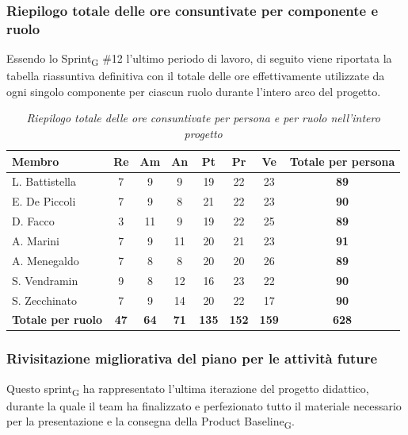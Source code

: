 ﻿\documentclass[a4paper, 10pt, colorlinks=true, linkcolor=black, urlcolor=blue, citecolor=blue, hidelinks]{article}
\renewcommand{\arraystretch}{1.2}
\begin{document}
\subsubsection{Riepilogo totale delle ore consuntivate per componente e ruolo}
Essendo lo Sprint\textsubscript{G} \#12 l'ultimo periodo di lavoro, di seguito viene riportata la tabella riassuntiva definitiva con il totale delle ore effettivamente utilizzate da ogni singolo componente per ciascun ruolo durante l'intero arco del progetto. 

\begin{table}[H]
    \centering
    \renewcommand{\arraystretch}{1.4}
    \begin{tabular}{|l|c|c|c|c|c|c|c|}
        \hline
        \rowcolor{bluBitless!15}
        \textbf{Membro} & \textbf{Re} & \textbf{Am} & \textbf{An} & \textbf{Pt} & \textbf{Pr} & \textbf{Ve} & \textbf{Totale per persona} \\
        \hline
        L. Battistella & 7 & 9 & 9 & 19 & 22 & 23 & \textbf{89} \\ \hline
        E. De Piccoli & 7 & 9 & 8 & 21 & 22 & 23 & \textbf{90} \\ \hline
        D. Facco & 3 & 11 & 9 & 19 & 22 & 25 & \textbf{89} \\ \hline
        A. Marini & 7 & 9 & 11 & 20 & 21 & 23 & \textbf{91} \\ \hline
        A. Menegaldo & 7 & 8 & 8 & 20 & 20 & 26 & \textbf{89} \\ \hline
        S. Vendramin & 9 & 8 & 12 & 16 & 23 & 22 & \textbf{90} \\ \hline
        S. Zecchinato & 7 & 9 & 14 & 20 & 22 & 17 & \textbf{90} \\ \hline
        \rowcolor{bluBitless!8}
        \textbf{Totale per ruolo} & \textbf{47} & \textbf{64} & \textbf{71} & \textbf{135} & \textbf{152} & \textbf{159} & \textbf{628} \\
        \hline
    \end{tabular}
    \caption{\textit{Riepilogo totale delle ore consuntivate per persona e per ruolo nell'intero progetto}}
\end{table}

\subsubsection{Rivisitazione migliorativa del piano per le attività future}
Questo sprint\textsubscript{G} ha rappresentato l’ultima iterazione del progetto didattico, durante la quale il team ha finalizzato e perfezionato tutto il materiale necessario per la presentazione e la consegna della Product Baseline\textsubscript{G}.
\end{document}
